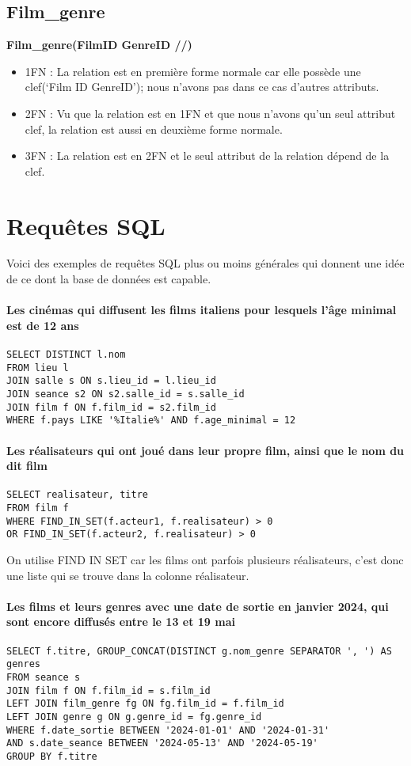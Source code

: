 \documentclass[12pt]{article}
\begin{document}
\subsection{Film{\_}genre}
\textbf{Film{\_}genre(FilmID GenreID //)}
\begin{itemize}
    \item 1FN : La relation est en première forme normale car elle possède une clef(‘Film ID GenreID’); nous n’avons pas dans ce cas d’autres attributs. 
    \item 2FN : Vu que la relation est en 1FN et que nous n'avons qu'un seul attribut clef, la relation est aussi
    en deuxième forme normale.
    \item 3FN : La relation est en 2FN et le seul attribut de la relation dépend de la clef.
\end{itemize}
\pagebreak
\section{Requêtes SQL}
Voici des exemples de requêtes SQL plus ou moins générales qui donnent une idée de ce dont la base de données est capable.
\paragraph*{Les cinémas qui diffusent les films italiens pour lesquels l'âge minimal est de 12 ans}
\begin{verbatim}
SELECT DISTINCT l.nom  
FROM lieu l 
JOIN salle s ON s.lieu_id = l.lieu_id  
JOIN seance s2 ON s2.salle_id = s.salle_id  
JOIN film f ON f.film_id = s2.film_id  
WHERE f.pays LIKE '%Italie%' AND f.age_minimal = 12 
\end{verbatim}
\paragraph*{Les réalisateurs qui ont joué dans leur propre film, ainsi que le nom du dit film}
\begin{verbatim}
SELECT realisateur, titre 
FROM film f  
WHERE FIND_IN_SET(f.acteur1, f.realisateur) > 0 
OR FIND_IN_SET(f.acteur2, f.realisateur) > 0 
\end{verbatim}
On utilise FIND IN SET car les films ont parfois plusieurs réalisateurs, 
c'est donc une liste qui se trouve dans la colonne réalisateur.
\paragraph*{Les films et leurs genres avec une date de sortie en janvier 2024, qui sont encore diffusés entre le 13 et 19 mai}
\begin{verbatim}
SELECT f.titre, GROUP_CONCAT(DISTINCT g.nom_genre SEPARATOR ', ') AS genres 
FROM seance s  
JOIN film f ON f.film_id = s.film_id  
LEFT JOIN film_genre fg ON fg.film_id = f.film_id  
LEFT JOIN genre g ON g.genre_id = fg.genre_id  
WHERE f.date_sortie BETWEEN '2024-01-01' AND '2024-01-31' 
AND s.date_seance BETWEEN '2024-05-13' AND '2024-05-19'  
GROUP BY f.titre 
\end{verbatim}
\end{document}
